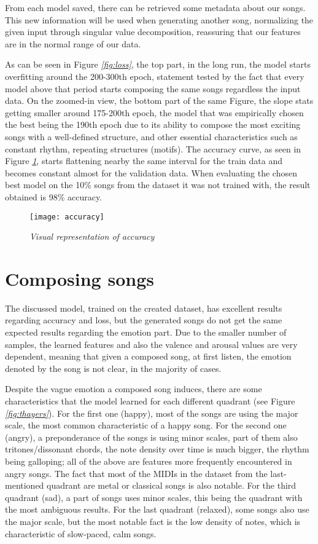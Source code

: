 From each model saved,
there can be retrieved some metadata about our songs.
This new information will be used when generating another song,
normalizing the given input through singular value decomposition,
reassuring that our features are in the normal range of our data.


As can be seen in Figure \emph{\ref{fig:loss}}, the top part, in the long run,
the model starts overfitting around the 200-300th epoch,
statement tested by the fact that every model above that period starts
composing the same songs regardless the input data. On the zoomed-in view,
the bottom part of the same Figure, the slope stats getting smaller around 175-200th epoch,
the model that was empirically chosen the best being the 190th epoch
due to its ability to compose the most exciting songs with a well-defined structure,
and other essential characteristics such as constant rhythm,
repeating structures (motifs). The accuracy curve, as seen in Figure \emph{\ref{fig:accuracy}},
starts flattening nearby the same interval for the train data and becomes
constant almost for the validation data.
When evaluating the chosen best model on the 10\% songs from the dataset
it was not trained with, the result obtained is 98\% accuracy.


\begin{figure}[h]
      \centering
      \texttt{[image: accuracy]}
      \caption{\emph{Visual representation of accuracy}}
      \label{fig:accuracy}
\end{figure}



\section{Composing songs}
The discussed model, trained on the created dataset,
has excellent results regarding accuracy and loss,
but the generated songs do not get the same expected results regarding the emotion part.
Due to the smaller number of samples,
the learned features and also the valence and arousal values are very dependent,
meaning that given a composed song, at first listen,
the emotion denoted by the song is not clear, in the majority of cases.

Despite the vague emotion a composed song induces,
there are some characteristics that the model learned for each different quadrant
(see Figure \emph{\ref{fig:thayers}}).
For the first one (happy), most of the songs are using the major scale,
the most common characteristic of a happy song.
For the second one (angry), a preponderance of the songs is using minor scales,
part of them also tritones/dissonant chords,
the note density over time is much bigger,
the rhythm being galloping;
all of the above are features more frequently encountered in angry songs.
The fact that most of the MIDIs in the dataset from the last-mentioned quadrant
are metal or classical songs is also notable.
For the third quadrant (sad), a part of songs uses minor scales,
this being the quadrant with the most ambiguous results.
For the last quadrant (relaxed), some songs also use the major scale,
but the most notable fact is the low density of notes,
which is characteristic of slow-paced, calm songs.

